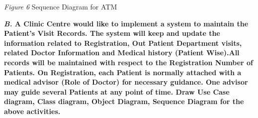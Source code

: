 \documentclass[12pt, letterpaper, twoside]{book}
\begin{document}
\begin{center}
\end{center}
\begin{center}
\emph{Figure 6} Sequence Diagram for ATM
\end{center}
\begin{flushleft}
\textbf{\emph{B.} A Clinic Centre would like to implement a system to maintain the Patient’s Visit Records. The system will keep  and  update  the  information  related  to  Registration,  Out  Patient  Department  visits,  related  Doctor Information  and  Medical  history  (Patient  Wise).All  records  will  be  maintained  with  respect  to  the Registration Number of Patients. On Registration, each Patient is normally attached with a medical advisor (Role of Doctor) for necessary guidance. One advisor may guide several Patients at any point of time. Draw Use Case diagram, Class diagram, Object Diagram, Sequence Diagram for the above activities.}
\end{flushleft}
\end{document}
